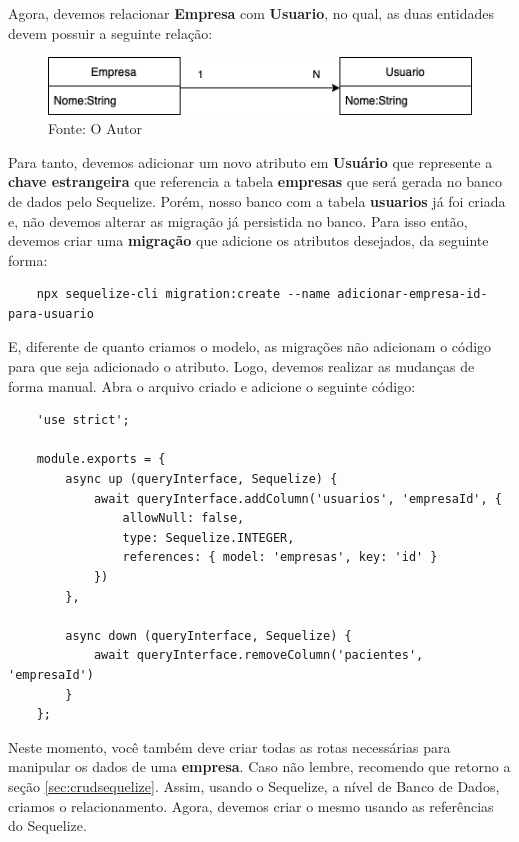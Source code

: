 Agora, devemos relacionar \textbf{Empresa} com \textbf{Usuario}, no qual, as duas entidades devem possuir a seguinte relação:

\begin{figure}[H]
	\centering
	\includegraphics[scale=0.8]{imagens/empresa-usuario.png}
	\caption{
		Fonte: O Autor
	}
\end{figure}

Para tanto, devemos adicionar um novo atributo em \textbf{Usuário} que represente a \textbf{chave estrangeira} que referencia a tabela \textbf{empresas} que será gerada no banco de dados pelo Sequelize. Porém, nosso banco com a tabela \textbf{usuarios} já foi criada e, não devemos alterar as migração já persistida no banco. Para isso então, devemos criar uma  \textbf{migração} que adicione os atributos desejados, da seguinte forma:

\begin{verbatim}
	npx sequelize-cli migration:create --name adicionar-empresa-id-para-usuario
\end{verbatim}

E, diferente de quanto criamos o modelo, as migrações não adicionam o código para que seja adicionado o atributo. Logo, devemos realizar as mudanças de forma manual. Abra o arquivo criado e adicione o seguinte código:

\begin{verbatim}
	'use strict';
	
	module.exports = {
		async up (queryInterface, Sequelize) {
			await queryInterface.addColumn('usuarios', 'empresaId', {
				allowNull: false,
				type: Sequelize.INTEGER,
				references: { model: 'empresas', key: 'id' }
			})
		},
		
		async down (queryInterface, Sequelize) {
			await queryInterface.removeColumn('pacientes', 'empresaId')
		}
	};
\end{verbatim}

Neste momento, você também deve criar todas as rotas necessárias para manipular os dados de uma \textbf{empresa}. Caso não lembre, recomendo que retorno a seção \ref{sec:crudsequelize}.
Assim, usando o Sequelize, a nível de Banco de Dados, criamos o relacionamento. Agora, devemos criar o mesmo usando as referências do Sequelize.

